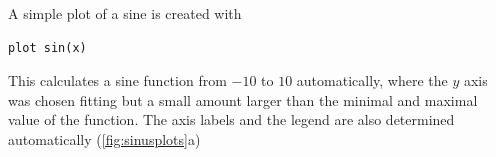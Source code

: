 \documentclass[DIV=14,headsepline,footsepline]{scrbook}
\begin{document}
				A simple plot of a sine is created with
				\begin{lstlisting}
plot sin(x)
				\end{lstlisting}
				This calculates a sine function from $-10$ to $10$ automatically, where the $y$ axis was chosen fitting but a small amount larger than the minimal and maximal value of the function. The axis labels and the legend are also determined automatically (\autoref{fig:sinusplots}a)
				\begin{figure}[p]%
					\centering
					\\
					\\

\end{figure}
\end{document}
